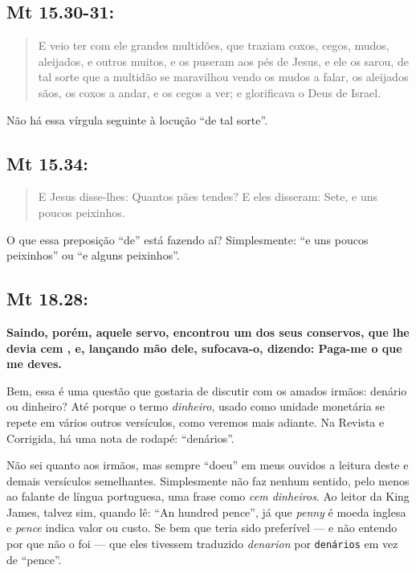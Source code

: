 \subsection{Mt 15.30-31:}
\begin{quote} \small E veio ter com ele grandes multidões, que traziam coxos, cegos, mudos, aleijados, e outros muitos, e os puseram aos pés de Jesus, e ele os sarou, de tal sorte\uwave{,} que a multidão se maravilhou vendo os mudos a falar, os aleijados sãos, os coxos a andar, e os cegos a ver; e glorificava o Deus de Israel. \end{quote}

Não há essa vírgula seguinte à locução ``de tal sorte''.

\subsection{Mt 15.34:}
\begin{quote}
 \small
 E Jesus disse-lhes: Quantos pães tendes? E eles disseram: Sete, e uns poucos  peixinhos.
\end{quote}

O que essa preposição ``de'' está fazendo aí? Simplesmente: ``e uns poucos peixinhos'' ou ``e alguns peixinhos''.

\subsection{Mt 18.28:} \label{denario}
\textbf{Saindo, porém, aquele servo, encontrou um dos seus
conservos, que lhe devia cem , e, lançando mão dele, sufocava-o, dizendo: Paga-me o que me deves.}

Bem, essa é uma questão que gostaria de discutir com os amados irmãos:
denário ou dinheiro? Até porque o termo \emph{dinheiro}, usado como
unidade monetária se repete em vários outros versículos, como veremos
mais adiante. Na Revista e Corrigida, há uma nota de rodapé:
``denários''.

Não sei quanto aos irmãos, mas sempre ``doeu'' em meus ouvidos a
leitura deste e demais versículos semelhantes. Simplesmente não faz
nenhum sentido, pelo menos ao falante de língua portuguesa, uma frase
como \emph{cem dinheiros}. Ao leitor da King James, talvez sim, quando
lê: ``An hundred pence'', já que \emph{penny} é moeda inglesa e
\emph{pence} indica valor ou custo. Se bem que teria sido preferível
--- e não entendo por que não o foi --- que eles tivessem traduzido
\emph{denarion} por \texttt{denários} em vez de ``pence''.

